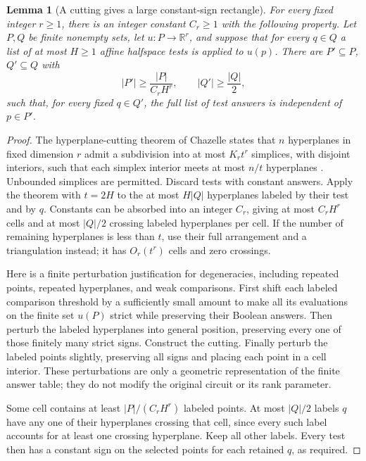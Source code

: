 \documentclass[11pt]{article}
\newtheorem{lemma}[theorem]{Lemma}
\theoremstyle{definition}
\newcommand{\R}{\mathbb R}
\begin{document}
\begin{lemma}[A cutting gives a large constant-sign rectangle]\label{lem:rankcut}
For every fixed integer \(r\ge1\), there is an integer constant \(C_r\ge1\) with the following property. Let \(P,Q\) be finite nonempty sets, let \(u:P\to\R^r\), and suppose that for every \(q\in Q\) a list of at most \(H\ge1\) affine halfspace tests is applied to \(u(p)\). There are \(P'\subseteq P\), \(Q'\subseteq Q\) with
\[
 |P'|\ge\frac{|P|}{C_rH^r},\qquad |Q'|\ge\frac{|Q|}{2},
\]
such that, for every fixed \(q\in Q'\), the full list of test answers is independent of \(p\in P'\).
\end{lemma}
\begin{proof}
The hyperplane-cutting theorem of Chazelle states that \(n\) hyperplanes in fixed dimension \(r\) admit a subdivision into at most \(K_rt^r\) simplices, with disjoint interiors, such that each simplex interior meets at most \(n/t\) hyperplanes \cite{Chazelle93}. Unbounded simplices are permitted. Discard tests with constant answers. Apply the theorem with \(t=2H\) to the at most \(H|Q|\) hyperplanes labeled by their test and by \(q\). Constants can be absorbed into an integer \(C_r\), giving at most \(C_rH^r\) cells and at most \(|Q|/2\) crossing labeled hyperplanes per cell. If the number of remaining hyperplanes is less than \(t\), use their full arrangement and a triangulation instead; it has \(O_r(t^r)\) cells and zero crossings.

Here is a finite perturbation justification for degeneracies, including repeated points, repeated hyperplanes, and weak comparisons. First shift each labeled comparison threshold by a sufficiently small amount to make all its evaluations on the finite set \(u(P)\) strict while preserving their Boolean answers. Then perturb the labeled hyperplanes into general position, preserving every one of those finitely many strict signs. Construct the cutting. Finally perturb the labeled points slightly, preserving all signs and placing each point in a cell interior. These perturbations are only a geometric representation of the finite answer table; they do not modify the original circuit or its rank parameter.

Some cell contains at least \(|P|/(C_rH^r)\) labeled points. At most \(|Q|/2\) labels \(q\) have any one of their hyperplanes crossing that cell, since every such label accounts for at least one crossing hyperplane. Keep all other labels. Every test then has a constant sign on the selected points for each retained \(q\), as required.
\end{proof}
\end{document}
